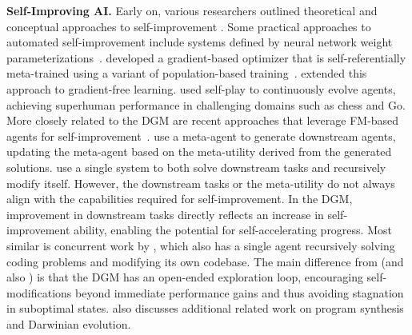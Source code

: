 \textbf{Self-Improving AI.}
Early on, various researchers outlined theoretical and conceptual approaches to self-improvement \citep{good1966speculations, schmidhuber1987evolutionary, schmidhuber2007godel}. Some practical approaches to automated self-improvement include systems defined by neural network weight parameterizations~\citep{schmidhuber1993self, hall2007self, hobbhahn2025swebenchmini, kirsch2022self, irie2022modern, irie2025metalearning, lu2023arbitrary, havrilla2024glore}. \citet{metz2021training} developed a gradient-based optimizer that is self-referentially meta-trained using a variant of population-based training~\citep{jaderberg2017population}. \citet{lange2023discovering} extended this approach to gradient-free learning. \citet{silver2017mastering} used self-play to continuously evolve agents, achieving superhuman performance in challenging domains such as chess and Go. More closely related to the DGM are recent approaches that leverage FM-based agents for self-improvement~\citep{yin2024g, robeyns2025self, hu2024self, zelikman2024self, huang2022large, singh2023beyond}. \citet{zelikman2024self} use a meta-agent to generate downstream agents, updating the meta-agent based on the meta-utility derived from the generated solutions. \citet{yin2024g} use a single system to both solve downstream tasks and recursively modify itself. However, the downstream tasks or the meta-utility do not always align with the capabilities required for self-improvement. In the DGM, improvement in downstream tasks directly reflects an increase in self-improvement ability, enabling the potential for self-accelerating progress. Most similar is concurrent work by \citet{robeyns2025self}, which also has a single agent recursively solving coding problems and modifying its own codebase. The main difference from \citet{robeyns2025self} (and also \citet{zelikman2024self, yin2024g}) is that the DGM has an open-ended exploration loop, encouraging self-modifications beyond immediate performance gains and thus avoiding stagnation in suboptimal states.  also discusses additional related work on program synthesis and Darwinian evolution.
